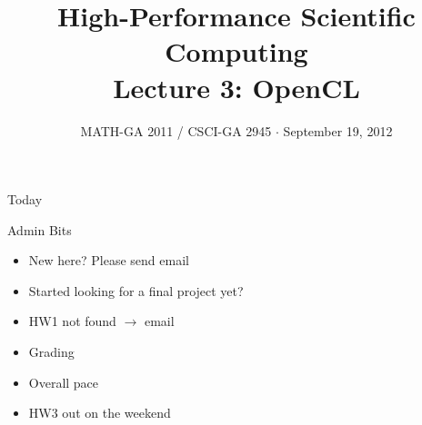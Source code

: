 \documentclass[english,compress]{beamer}
\begin{document}

\title{High-Performance Scientific Computing\\Lecture 3: OpenCL}

\date{MATH-GA 2011 / CSCI-GA 2945 $\cdot$ September 19, 2012}

\frame{\titlepage}

\begin{frame}{Today}
  \tableofcontents[hideallsubsections]
\end{frame}
\begin{frame}{Admin Bits}
  \begin{itemize}[<+->]
    \item New here? Please send email
    \item Started looking for a final project yet?
    \item HW1 not found $\rightarrow$ email
    \item Grading
    \item Overall pace
    \item HW3 out on the weekend
  \end{itemize}
\end{frame}
\end{document}
